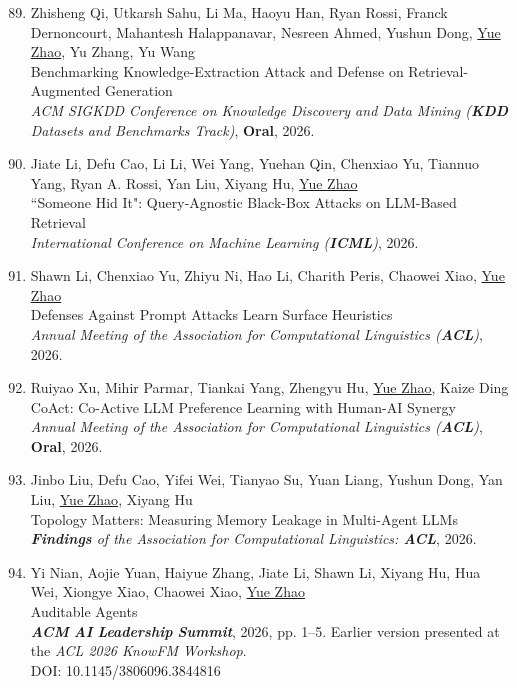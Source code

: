 \documentclass[margin,line,pifont,palatino,courier]{res}
\newenvironment{benumerate}[1]{
    \let\oldItem\item
    \def\item{\addtocounter{enumi}{-2}\oldItem}
    \begin{enumerate}[leftmargin=0.25in,label=\textcolor{uscred}{\arabic*.}]
    \setcounter{enumi}{#1}
    \addtocounter{enumi}{1}
}{
    \end{enumerate}
}
\begin{document}
\begin{resume}
\begin{benumerate}{88}
    \item
    Zhisheng Qi, Utkarsh Sahu, Li Ma, Haoyu Han, Ryan Rossi, Franck Dernoncourt, Mahantesh Halappanavar, Nesreen Ahmed, Yushun Dong, \underline{Yue Zhao}, Yu Zhang, Yu Wang\\
    Benchmarking Knowledge-Extraction Attack and Defense on Retrieval-Augmented Generation\\
    \textit{ACM SIGKDD Conference on Knowledge Discovery and Data Mining (\textbf{KDD} Datasets and Benchmarks Track)}, \faAward \xspace \textbf{Oral}, 2026.

    \item
    Jiate Li, Defu Cao, Li Li, Wei Yang, Yuehan Qin, Chenxiao Yu, Tiannuo Yang, Ryan A. Rossi, Yan Liu, Xiyang Hu, \underline{Yue Zhao}\\
    ``Someone Hid It": Query-Agnostic Black-Box Attacks on LLM-Based Retrieval\\
    \textit{International Conference on Machine Learning (\textbf{ICML})}, 2026.

    \item
    Shawn Li, Chenxiao Yu, Zhiyu Ni, Hao Li, Charith Peris, Chaowei Xiao, \underline{Yue Zhao}\\
    Defenses Against Prompt Attacks Learn Surface Heuristics\\
    \textit{Annual Meeting of the Association for Computational Linguistics (\textbf{ACL})}, 2026.

    \item
    Ruiyao Xu, Mihir Parmar, Tiankai Yang, Zhengyu Hu, \underline{Yue Zhao}, Kaize Ding\\
    CoAct: Co-Active LLM Preference Learning with Human-AI Synergy\\
    \textit{Annual Meeting of the Association for Computational Linguistics (\textbf{ACL})}, \faAward \xspace \textbf{Oral}, 2026.

    \item
    Jinbo Liu, Defu Cao, Yifei Wei, Tianyao Su, Yuan Liang, Yushun Dong, Yan Liu, \underline{Yue Zhao}, Xiyang Hu\\
    Topology Matters: Measuring Memory Leakage in Multi-Agent LLMs\\
    \textit{\textbf{Findings} of the Association for Computational Linguistics: \textbf{ACL}}, 2026.

    \item
    Yi Nian, Aojie Yuan, Haiyue Zhang, Jiate Li, Shawn Li, Xiyang Hu, Hua Wei, Xiongye Xiao, Chaowei Xiao, \underline{Yue Zhao}\\
    Auditable Agents\\
    \textit{\textbf{ACM} \textbf{AI} \textbf{Leadership} \textbf{Summit}}, 2026, pp. 1--5.
    Earlier version presented at the \textit{ACL 2026 KnowFM Workshop}.\\
    DOI: 10.1145/3806096.3844816


\end{benumerate}
\end{resume}
\end{document}
